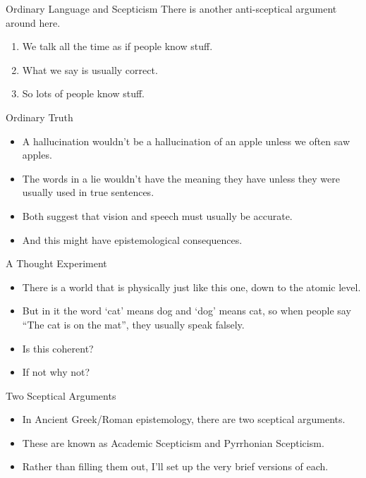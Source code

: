 \documentclass[
  17pt,
  letterpaper,
  ignorenonframetext,
  aspectratio=169,
  handout]{beamer}
\providecommand{\tightlist}{%
  \setlength{\itemsep}{0pt}\setlength{\parskip}{0pt}}\usepackage{longtable,booktabs,array}
\begin{document}
\begin{frame}{Ordinary Language and Scepticism}
\protect\hypertarget{ordinary-language-and-scepticism}{}
There is another anti-sceptical argument around here.

\begin{enumerate}[<+->]
\tightlist
\item
  We talk all the time as if people know stuff.
\item
  What we say is usually correct.
\item
  So lots of people know stuff.
\end{enumerate}
\end{frame}

\begin{frame}{Ordinary Truth}
\protect\hypertarget{ordinary-truth}{}
\begin{itemize}[<+->]
\tightlist
\item
  A hallucination wouldn't be a hallucination of an apple unless we
  often saw apples.
\item
  The words in a lie wouldn't have the meaning they have unless they
  were usually used in true sentences.
\item
  Both suggest that vision and speech must usually be accurate.
\item
  And this might have epistemological consequences.
\end{itemize}
\end{frame}

\begin{frame}{A Thought Experiment}
\protect\hypertarget{a-thought-experiment}{}
\begin{itemize}[<+->]
\tightlist
\item
  There is a world that is physically just like this one, down to the
  atomic level.
\item
  But in it the word `cat' means dog and `dog' means cat, so when people
  say ``The cat is on the mat'', they usually speak falsely.
\item
  Is this coherent?
\item
  If not why not?
\end{itemize}
\end{frame}

\begin{frame}{Two Sceptical Arguments}
\protect\hypertarget{two-sceptical-arguments}{}
\begin{itemize}[<+->]
\tightlist
\item
  In Ancient Greek/Roman epistemology, there are two sceptical
  arguments.
\item
  These are known as Academic Scepticism and Pyrrhonian Scepticism.
\item
  Rather than filling them out, I'll set up the very brief versions of
  each.
\end{itemize}
\end{frame}
\end{document}
